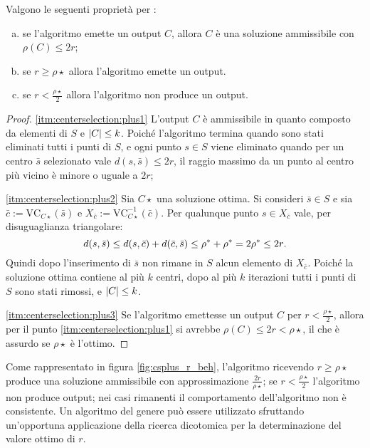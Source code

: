 \begin{theorem}
	Valgono le seguenti proprietà per \CenterSelectionPlus:
	\begin{enumerate}[(a)]
		\item \label{itm:centerselection:plus1} se l'algoritmo emette un output $C$, allora $C$ è una soluzione ammissibile con $\rho(C)\leq 2r$;
		\item \label{itm:centerselection:plus2} se $r\geq\rho\star$ allora l'algoritmo emette un output.
		\item \label{itm:centerselection:plus3} se $r<\frac{\rho\star}{2}$ allora l'algoritmo non produce un output.
	\end{enumerate}
\end{theorem}
\begin{proof}
	\ref{itm:centerselection:plus1} L'output $C$ è ammissibile in quanto composto da elementi di $S$ e $\card C\leq k$.
	Poiché l'algoritmo termina quando sono stati eliminati tutti i punti di $S$, e ogni punto $s\in S$ viene eliminato quando per un centro $\bar s$ selezionato vale $d(s,\bar s)\leq 2r$, il raggio massimo da un punto al centro più vicino è minore o uguale a $2r$;

	\ref{itm:centerselection:plus2} Sia $C\star$ una soluzione ottima. Si consideri $\bar s\in S$ e sia $\bar c:=\text{VC}_{C\star}(\bar s)$ e $X_{\bar c}:=\text{VC}_{C\star}^{-1}(\bar c)$.
	Per qualunque punto $s\in X_{\bar c}$ vale, per disuguaglianza triangolare:
	\begin{equation*}
		d(s,\bar s) \leq d(s,\bar c)+d(\bar c,\bar s) \leq \rho\star + \rho\star = 2\rho\star \leq 2r \text.
	\end{equation*}
	Quindi dopo l'inserimento di $\bar s$ non rimane in $S$ alcun elemento di $X_{\bar c}$.
	Poiché la soluzione ottima contiene al più $k$ centri, dopo al più $k$ iterazioni tutti i punti di $S$ sono stati rimossi, e $\card C\leq k$.

	\ref{itm:centerselection:plus3} Se l'algoritmo emettesse un output $C$ per $r<\frac{\rho\star}{2}$, allora per il punto \ref{itm:centerselection:plus1} si avrebbe $\rho(C)\leq 2r<\rho\star$, il che è assurdo se $\rho\star$ è l'ottimo.
\end{proof}


Come rappresentato in figura \ref{fig:csplus_r_beh}, l'algoritmo ricevendo $r\geq\rho\star$ produce una soluzione ammissibile con approssimazione $\frac{2r}{\rho\star}$; se $r<\frac{\rho\star}{2}$ l'algoritmo non produce output; nei casi rimanenti il comportamento dell'algoritmo non è consistente.
Un algoritmo del genere può essere utilizzato sfruttando un'opportuna applicazione della ricerca dicotomica per la determinazione del valore ottimo di $r$.

